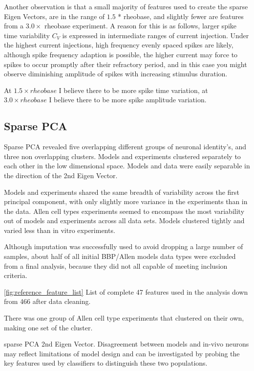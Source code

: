 Another observation is that a small majority of features used to create the sparse Eigen Vectors, are in the range of $1.5$ * rheobase, and slightly fewer are features from a $3.0\times$ rheobase experiment. A reason for this is as follows, larger spike time variability $C_{V}$ is expressed in intermediate ranges of current injection. Under the highest current injections, high frequency evenly spaced spikes are likely, although spike frequency adaption is possible, the higher current may force to spikes to occur promptly after their refractory period, and in this case you might observe diminishing amplitude of spikes with increasing stimulus duration.

At $1.5 \times rheobase $ I believe there to be more spike time variation, at $3.0 \times rheobase $  I believe there to be more spike amplitude variation.

\subsection{Sparse PCA}
Sparse PCA revealed five overlapping different groups of neuronal identity's, and three non overlapping clusters. Models and experiments clustered separately to each other in the low dimensional space. Models and data were easily separable in the direction of the 2nd Eigen Vector.

Models and experiments shared the same breadth of variability across the first principal component, with only slightly more variance in the experiments than in the data. Allen cell types experiments seemed to encompass the most variability out of models and experiments across all data sets. Models clustered tightly and varied less than in vitro experiments.



Although imputation was successfully used to avoid dropping a large number of samples, about half of all initial BBP/Allen models data types were excluded from a final analysis, because they did not all capable of meeting inclusion criteria.  

\ref{fig:reference_feature_list}
List of complete 47 features used in the analysis down from 466 after data cleaning.


There was one group of Allen cell type experiments that clustered on their own, making one set of the cluster.

sparse PCA 2nd Eigen Vector. 
Disagreement between models and in-vivo neurons may reflect limitations of model design and can be investigated by probing the key features used by classifiers to distinguish these two populations. 

